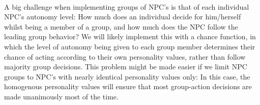 \documentclass[11pt]{article} %
\begin{document}
~\\
A big challenge when implementing groups of NPC's is that of each individual NPC's autonomy level: How much does an individual decide for him/herself whilst being a member of a group, and how much does the NPC follow the leading group behavior? We will likely implement this with a chance function, in which the level of autonomy being given to each group member determines their chance of acting according to their own personality values, rather than follow majority group decisions. This problem might be made easier if we limit NPC groups to NPC's with nearly identical personality values only: In this case, the homogenous personality values will ensure that most group-action decisions are made unanimously most of the time.

\end{document}
